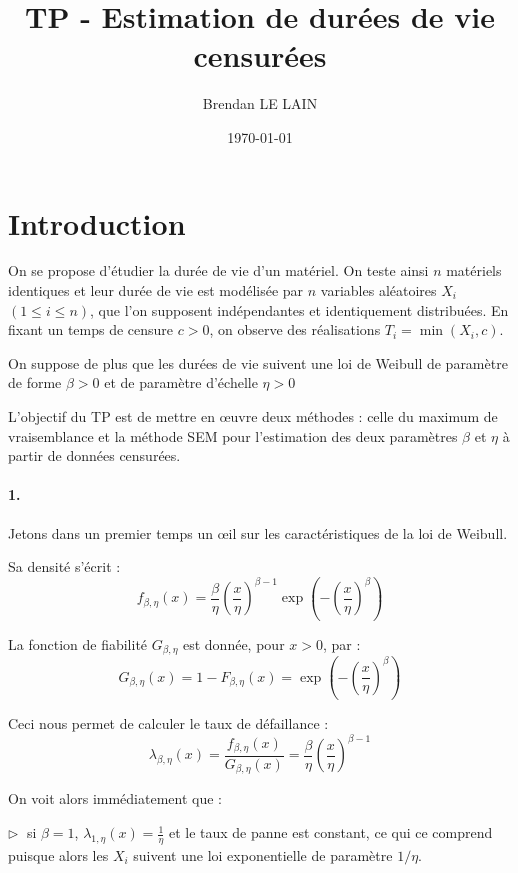 \documentclass[a4paper]{report}
\title {TP - Estimation de durées de vie censurées}
\author {Brendan LE LAIN}
\date{\today}
\begin{document}
 
\pagestyle{headings}
 
\maketitle
 
 \tableofcontents

\chapter* {Introduction}

On se propose d'étudier la durée de vie d'un matériel. On teste ainsi $n$ matériels identiques et leur durée de vie est modélisée par $n$ variables aléatoires $X_i$ $(1 \le i \le n)$, que l'on supposent indépendantes et identiquement distribuées. En fixant un temps de censure $c > 0$, on observe des réalisations $T_i = \min (X_i,c)$.

On suppose de plus que les durées de vie suivent une loi de Weibull de paramètre de forme $\beta >0$ et de paramètre d'échelle $\eta >0$

L'objectif du TP est de mettre en œuvre deux méthodes : celle du maximum de vraisemblance et la méthode SEM pour l'estimation des deux paramètres $\beta$ et $\eta$ à partir de données censurées.

\subsubsection{1.}

Jetons dans un premier temps un œil sur les caractéristiques de la loi de Weibull.

Sa densité s'écrit : 
\[f_{\beta,\eta}(x)=\frac{\beta}{\eta} \left(\frac{x}{\eta}\right)^{\beta-1} \exp\left(-\left(\frac{x}{\eta}\right)^{\beta}\right)\]

La fonction de fiabilité $G_{\beta,\eta}$ est donnée, pour $x>0$, par :
\[G_{\beta,\eta}(x)=1-F_{\beta,\eta}(x)=\exp\left(-\left(\frac{x}{\eta}\right)^{\beta}\right)\]

 Ceci nous permet de calculer le taux de défaillance : 
 \[\lambda_{\beta,\eta}(x)=\frac{f_{\beta,\eta}(x)}{G_{\beta,\eta}(x)}=\frac{\beta}{\eta} \left(\frac{x}{\eta}\right)^{\beta-1}\]
 
 On voit alors immédiatement que :
 
 $\triangleright \; $ si $\beta=1$, $\lambda_{1,\eta}(x)=\frac{1}{\eta}$ et le taux de panne est constant, ce qui ce comprend puisque alors les $X_i$ suivent une loi exponentielle de paramètre $1/\eta$.
 
\end{document}
